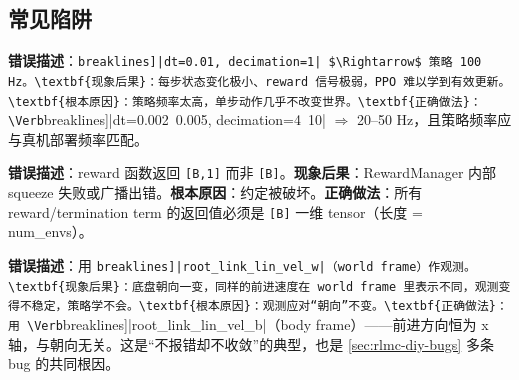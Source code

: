 \subsection{常见陷阱}
\label{sec:rlmc-diy-mjlab-pitfalls}


\begin{pitfall}
\textbf{错误描述}：\Verb[breaklines]|dt=0.01, decimation=1| $\Rightarrow$ 策略 100 Hz。\textbf{现象后果}：每步状态变化极小、reward 信号极弱，PPO 难以学到有效更新。\textbf{根本原因}：策略频率太高，单步动作几乎不改变世界。\textbf{正确做法}：\Verb[breaklines]|dt=0.002~0.005, decimation=4~10| $\Rightarrow$ 20--50 Hz，且策略频率应与真机部署频率匹配。
\end{pitfall}

\begin{pitfall}
\textbf{错误描述}：reward 函数返回 \verb|[B,1]| 而非 \verb|[B]|。\textbf{现象后果}：RewardManager 内部 squeeze 失败或广播出错。\textbf{根本原因}：约定被破坏。\textbf{正确做法}：所有 reward/termination term 的返回值必须是 \verb|[B]| 一维 tensor（长度 = num\_envs）。
\end{pitfall}

\begin{pitfall}
\textbf{错误描述}：用 \Verb[breaklines]|root_link_lin_vel_w|（world frame）作观测。\textbf{现象后果}：底盘朝向一变，同样的前进速度在 world frame 里表示不同，观测变得不稳定，策略学不会。\textbf{根本原因}：观测应对“朝向”不变。\textbf{正确做法}：用 \Verb[breaklines]|root_link_lin_vel_b|（body frame）——前进方向恒为 x 轴，与朝向无关。这是“不报错却不收敛”的典型，也是 \cref{sec:rlmc-diy-bugs} 多条 bug 的共同根因。
\end{pitfall}

